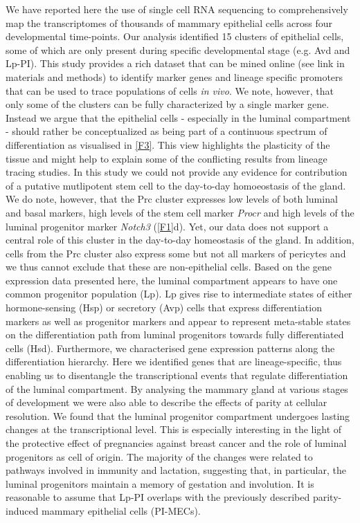 \documentclass[titlepage, 12pt, oneside]{amsart}
\begin{document}
We have reported here the use of single cell RNA sequencing to comprehensively map the transcriptomes of thousands of mammary epithelial cells across four developmental time-points.
Our analysis identified 15 clusters of epithelial cells, some of which are only present during specific developmental stage (e.g. Avd and Lp-PI).
This study provides a rich dataset that can be mined online (see link in materials and methods) to identify marker genes and lineage specific promoters that can be used to trace populations of cells \textit{in vivo}.
We note, however, that only some of the clusters can be fully characterized by a single marker gene.
Instead we argue that the epithelial cells - especially in the luminal compartment - should rather be conceptualized as being part of a continuous spectrum of differentiation as visualised in \autoref{F3}.
This view highlights the plasticity of the tissue and might help to explain some of the conflicting results from lineage tracing studies\autocite{Inman2015}.
In this study we could not provide any evidence for contribution of a putative mutlipotent stem cell to the day-to-day homoeostasis of the gland.
We do note, however, that the Prc cluster expresses low levels of both luminal and basal markers, high levels of the stem cell marker \textit{Procr}\autocite{Wang2015} and high levels of the luminal progenitor marker \textit{Notch3}\autocite{Lafkas2013} (\autoref{F1}d).
Yet, our data does not support a central role of this cluster in the day-to-day homeostasis of the gland. 
In addition, cells from the Prc cluster also express some but not all markers of pericytes and we thus cannot exclude that these are non-epithelial cells. 
Based on the gene expression data presented here, the luminal compartment appears to have one common progenitor population (Lp).
Lp gives rise to intermediate states of either hormone-sensing (Hsp) or secretory (Avp) cells that express differentiation markers as well as progenitor markers and appear to represent meta-stable states on the differentiation path from luminal progenitors towards fully differentiated cells (Hsd).
Furthermore, we characterised gene expression patterns along the differentiation hierarchy.
Here we identified genes that are lineage-specific, thus enabling us to disentangle the transcriptional events that regulate differentiation of the luminal compartment.
By analysing the mammary gland at various stages of development we were also able to describe the effects of parity at cellular resolution.
We found that the luminal progenitor compartment undergoes lasting changes at the transcriptional level.
This is especially interesting in the light of the protective effect of pregnancies against breast cancer and the role of luminal progenitors as cell of origin.
The majority of the changes were related to pathways involved in immunity and lactation, suggesting that, in particular, the luminal progenitors maintain a memory of gestation and involution.
It is reasonable to assume that Lp-PI overlaps with the previously described parity-induced mammary epithelial cells (PI-MECs)\autocite{Wagner2002}.
\end{document}
